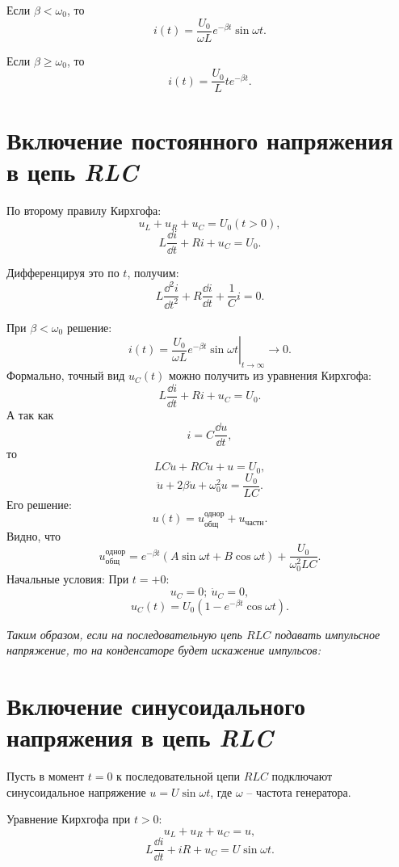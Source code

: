 	Если \( \beta < \omega_0 \), то
    \[
        i(t) = \frac{U_0}{\omega L}e^{-\beta t}\sin\omega t.
    \]
	
	Если \( \beta \geq \omega_0 \), то
    \[
        i(t) = \frac{U_0}{L}te^{-\beta t}.
    \]
	
\section{Включение постоянного напряжения в цепь \textit{RLC}}

	По второму правилу Кирхгофа:
	\[
        u_L + u_R + u_C = U_0 (t > 0),
    \]
	\[
        L\frac{\dd i}{\dd t} + Ri + u_C = U_0.
    \]
	
	Дифференцируя это по \( t \), получим:
	\[
        L\frac{\dd^2 i}{\dd t^2} + R\frac{\dd i}{\dd t} + \frac{1}{C}i = 0.
    \]
	
	При \( \beta < \omega_0 \) решение:
	\[
        i(t) = \left.\frac{U_0}{\omega L}e^{-\beta t}
        \sin\omega t\right|_{t\to\infty} \to 0.
    \]
	Формально, точный вид \( u_C(t) \) можно получить из уравнения Кирхгофа:
	\[
        L\frac{\dd i}{\dd t} + Ri + u_C = U_0.
    \]
	А так как
    \[
        i = C\frac{\dd u}{\dd t},
    \]
    то
	\[
        LC\ddot{u} + RC\dot{u} + u = U_0,
    \]
	\[
        \ddot{u} + 2\beta\dot{u} + \omega_0^2u = \frac{U_0}{LC}.
    \]
	Его решение:
	\[
        u(t) = u^{\text{однор}}_{\textit{общ}} + u_{\textit{частн}}.
    \]
	Видно, что
    \[
        u^{\text{однор}}_{\textit{общ}} = e^{-\beta t}(A\sin\omega t +
        B\cos\omega t) + \frac{U_0}{\omega_0^2LC}.
    \]
	Начальные условия:
	При \( t = +0 \):
	\[
        u_C = 0;\ \dot{u}_C = 0,
    \]
	\[
        u_C(t) = U_0(1 - e^{-\beta t}\cos\omega t).
    \]
	
	\textit{Таким образом, если на последовательную цепь \( RLC \) подавать
    импульсное напряжение, то на конденсаторе будет искажение импульсов:}

\section{Включение синусоидального напряжения в цепь \textit{RLC}}

	Пусть в момент \( t = 0 \) к последовательной цепи \( RLC \) подключают
    синусоидальное напряжение \( u = U\sin\omega t \), где \( \omega \) --
    частота генератора.
	
	Уравнение Кирхгофа при \( t > 0 \):
	\[
        u_L + u_R + u_C = u,
    \]
	\[
        L\frac{\dd i}{\dd t} + iR + u_C = U\sin\omega t.
    \]
	
